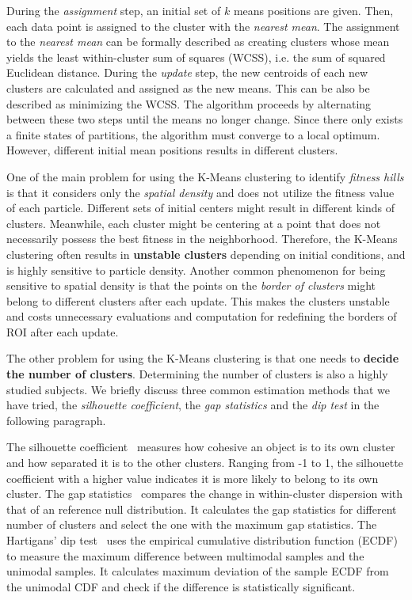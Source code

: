 During the \textit{assignment} step, an initial set of $k$ means positions are given.
Then, each data point is assigned to the cluster with the \textit{nearest mean}.
The assignment to the \textit{nearest mean} can be formally described 
as creating clusters whose mean yields the least within-cluster sum of squares (WCSS), i.e. the sum of squared Euclidean distance.
During the \textit{update} step, the new centroids of each new clusters are calculated and assigned as the new means.
This can be also be described as minimizing the WCSS.
The algorithm proceeds by alternating between these two steps until the means no longer change.
Since there only exists a finite states of partitions, the algorithm must converge to a local optimum.
However, different initial mean positions results in different clusters.

One of the main problem for using the K-Means clustering to identify \textit{fitness hills} is that
it considers only the \textit{spatial density} and does not utilize the fitness value of each particle.
Different sets of initial centers might result in different kinds of clusters.
Meanwhile, each cluster might be centering at a point that does not necessarily possess the best fitness in the neighborhood.
Therefore, the K-Means clustering often results in \textbf{unstable clusters} depending on initial conditions, and is highly sensitive to particle density.
Another common phenomenon for being sensitive to spatial density is that 
the points on the \textit{border of clusters} might belong to different clusters after each update.
This makes the clusters unstable and costs unnecessary evaluations and computation for redefining the borders of ROI after each update. 

The other problem for using the K-Means clustering is that one needs to \textbf{decide the number of clusters}.
Determining the number of clusters is also a highly studied subjects.
We briefly discuss three common estimation methods that we have tried, 
the \textit{silhouette coefficient}, the \textit{gap statistics} and the \textit{dip test} in the following paragraph.

The silhouette coefficient~\cite{Rousseeuw:1987:silhouettes} measures how cohesive an object is to its own cluster and how separated it is to the other clusters. Ranging from -1 to 1, the silhouette coefficient with a higher value indicates it is more likely to belong to its own cluster.
The gap statistics~\cite{Tibshirani:2001:gap} compares the change in within-cluster dispersion with that of an reference null distribution.
It calculates the gap statistics for different number of clusters and select the one with the maximum gap statistics.
The Hartigans' dip test~\cite{Hartigan:1985:dip} uses the empirical cumulative distribution function (ECDF) to measure the maximum difference between multimodal samples and the unimodal samples. It calculates maximum deviation of the sample ECDF from the unimodal CDF and check if the difference is statistically significant.


